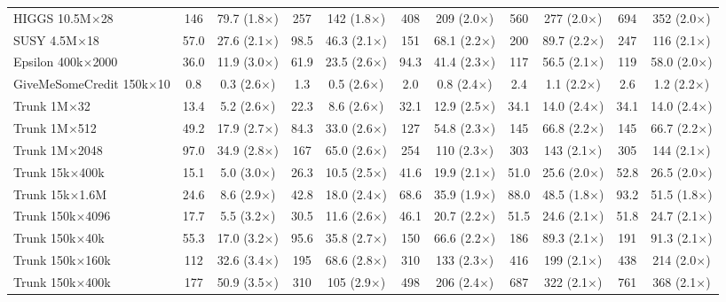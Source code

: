 \begin{table}[p]
\begin{tabular}{l|cc|cc|cc|cc|cc}
        \hline
        HIGGS 10.5M$\times$28 & 146 & 79.7 (1.8$\times$) & 257 & 142 (1.8$\times$) & 408 & 209 (2.0$\times$) & 560 & 277 (2.0$\times$) & 694 & 352 (2.0$\times$) \\
        SUSY 4.5M$\times$18 & 57.0 & 27.6 (2.1$\times$) & 98.5 & 46.3 (2.1$\times$) & 151 & 68.1 (2.2$\times$) & 200 & 89.7 (2.2$\times$) & 247 & 116 (2.1$\times$) \\
        Epsilon 400k$\times$2000 & 36.0 & 11.9 (3.0$\times$) & 61.9 & 23.5 (2.6$\times$) & 94.3 & 41.4 (2.3$\times$) & 117 & 56.5 (2.1$\times$) & 119 & 58.0 (2.0$\times$) \\
        GiveMeSomeCredit 150k$\times$10 & 0.8 & 0.3 (2.6$\times$) & 1.3 & 0.5 (2.6$\times$) & 2.0 & 0.8 (2.4$\times$) & 2.4 & 1.1 (2.2$\times$) & 2.6 & 1.2 (2.2$\times$) \\
        Trunk 1M$\times$32 & 13.4 & 5.2 (2.6$\times$) & 22.3 & 8.6 (2.6$\times$) & 32.1 & 12.9 (2.5$\times$) & 34.1 & 14.0 (2.4$\times$) & 34.1 & 14.0 (2.4$\times$) \\
        Trunk 1M$\times$512 & 49.2 & 17.9 (2.7$\times$) & 84.3 & 33.0 (2.6$\times$) & 127 & 54.8 (2.3$\times$) & 145 & 66.8 (2.2$\times$) & 145 & 66.7 (2.2$\times$) \\
        Trunk 1M$\times$2048 & 97.0 & 34.9 (2.8$\times$) & 167 & 65.0 (2.6$\times$) & 254 & 110 (2.3$\times$) & 303 & 143 (2.1$\times$) & 305 & 144 (2.1$\times$) \\
        Trunk 15k$\times$400k & 15.1 & 5.0 (3.0$\times$) & 26.3 & 10.5 (2.5$\times$) & 41.6 & 19.9 (2.1$\times$) & 51.0 & 25.6 (2.0$\times$) & 52.8 & 26.5 (2.0$\times$) \\
        Trunk 15k$\times$1.6M & 24.6 & 8.6 (2.9$\times$) & 42.8 & 18.0 (2.4$\times$) & 68.6 & 35.9 (1.9$\times$) & 88.0 & 48.5 (1.8$\times$) & 93.2 & 51.5 (1.8$\times$) \\
        Trunk 150k$\times$4096 & 17.7 & 5.5 (3.2$\times$) & 30.5 & 11.6 (2.6$\times$) & 46.1 & 20.7 (2.2$\times$) & 51.5 & 24.6 (2.1$\times$) & 51.8 & 24.7 (2.1$\times$) \\
        Trunk 150k$\times$40k & 55.3 & 17.0 (3.2$\times$) & 95.6 & 35.8 (2.7$\times$) & 150 & 66.6 (2.2$\times$) & 186 & 89.3 (2.1$\times$) & 191 & 91.3 (2.1$\times$) \\
        Trunk 150k$\times$160k & 112 & 32.6 (3.4$\times$) & 195 & 68.6 (2.8$\times$) & 310 & 133 (2.3$\times$) & 416 & 199 (2.1$\times$) & 438 & 214 (2.0$\times$) \\
        Trunk 150k$\times$400k & 177 & 50.9 (3.5$\times$) & 310 & 105 (2.9$\times$) & 498 & 206 (2.4$\times$) & 687 & 322 (2.1$\times$) & 761 & 368 (2.1$\times$) \\

\end{tabular}
\end{table}
